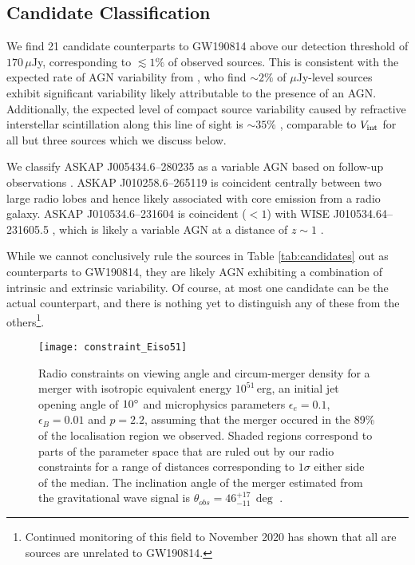 \subsection{Candidate Classification}
\label{sec:candidate_classification}
\vspace{-4pt}
We find 21 candidate counterparts to GW190814 above our detection threshold of $170\,\mu$Jy, corresponding to $\lesssim 1\%$ of observed sources. This is consistent with the expected rate of AGN variability from \citet{2019MNRAS.490.4024R}, who find $\sim 2\%$ of $\mu$Jy-level sources exhibit significant variability likely attributable to the presence of an AGN. Additionally, the expected level of compact source variability caused by refractive interstellar scintillation along this line of sight is $\sim 35\%$ \citep{2002astro.ph..7156C}, comparable to $V_{\rm int}$ for all but three sources which we discuss below.

We classify ASKAP J005434.6--280235 as a variable AGN based on follow-up observations \citep{GCN25449,GCN25445}. ASKAP J010258.6--265119 is coincident centrally between two large radio lobes and hence likely associated with core emission from a radio galaxy. ASKAP J010534.6--231604 is coincident ($<1$\arcsec) with WISE J010534.64--231605.5 \citep{2012yCat.2311....0C}, which is likely a variable AGN at a distance of $z\sim 1$ \citep{2017arXiv170908634G}.

While we cannot conclusively rule the sources in Table \ref{tab:candidates} out as counterparts to GW190814, they are likely AGN exhibiting a combination of intrinsic and extrinsic variability. Of course, at most one candidate can be the actual counterpart, and there is nothing yet to distinguish any of these from the others\footnote{Continued monitoring of this field to November 2020 has shown that all are sources are unrelated to GW190814.}.

\begin{figure}
    \captionsetup{width=\linewidth}
    \centering
    \texttt{[image: constraint\_Eiso51]}
    \caption[Radio constraints on the properties of GW190814]{Radio constraints on viewing angle and circum-merger density for a merger with isotropic equivalent energy $10^{51}$\,erg, an initial jet opening angle of $10\mbox{$^\circ$}$ and microphysics parameters $\epsilon_{e}=0.1$, $\epsilon_{B}=0.01$ and $p=2.2$, assuming that the merger occured in the 89\% of the localisation region we observed. Shaded regions correspond to parts of the parameter space that are ruled out by our radio constraints for a range of distances corresponding to $1\sigma$ either side of the median. The inclination angle of the merger estimated from the gravitational wave signal is $\theta_{obs}=46_{-11}^{+17}\,\deg$ \citep{2020ApJ...896L..44A}.}
    \label{fig:merger_constraints}
\end{figure}

